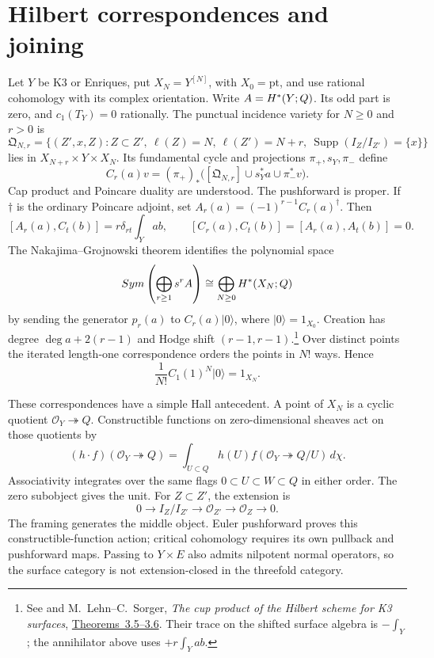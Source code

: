 \section{Hilbert correspondences and joining}
\label{sec:zbps-geometric-joining}

Let \(Y\) be K3 or Enriques, put \(X_N=Y^{[N]}\), with
\(X_0=\mathrm{pt}\), and use rational
cohomology with its complex orientation.  Write \(A=H^*(Y;Q)\).
Its odd part is zero, and \(c_1(T_Y)=0\) rationally.  The punctual
incidence variety for \(N\ge0\) and \(r>0\) is
\[
 \mathfrak Q_{N,r}=\{(Z',x,Z):Z\subset Z',\ \ell(Z)=N,
 \ \ell(Z')=N+r,\ \operatorname{Supp}(I_Z/I_{Z'})=\{x\}\}
\]
lies in \(X_{N+r}\times Y\times X_N\).  Its fundamental cycle
and projections \(\pi_+,s_Y,\pi_-\) define
\[
 C_r(a)v=(\pi_+)_*
       \bigl([\mathfrak Q_{N,r}]\cup s_Y^*a\cup\pi_-^*v\bigr).
\]
Cap product and Poincare duality are understood.  The pushforward
is proper.  If \(\dagger\) is the ordinary Poincare adjoint, set
\(A_r(a)=(-1)^{r-1}C_r(a)^\dagger\).  Then
\[
 [A_r(a),C_t(b)]=r\delta_{rt}\int_Yab,
 \qquad [C_r(a),C_t(b)]=[A_r(a),A_t(b)]=0.
\]
The Nakajima--Grojnowski theorem identifies the polynomial space
\[
 Sym\left(\bigoplus_{r\ge1}s^r A\right)
 \cong\bigoplus_{N\ge0}H^*(X_N;Q)
\]
by sending the generator \(p_r(a)\) to \(C_r(a)|0\rangle\),
where \(|0\rangle=1_{X_0}\).
Creation has degree \(\deg a+2(r-1)\) and Hodge shift
\((r-1,r-1)\).\footnote{See \cite{NakajimaHilbert1997} and
M.~Lehn--C.~Sorger, \emph{The cup product of the Hilbert scheme
for K3 surfaces}, \href{https://arxiv.org/abs/math/0012166}
{Theorems~3.5--3.6}.  Their trace on the shifted surface algebra
is \(-\int_Y\); the annihilator above uses \(+r\int_Yab\).}
Over distinct points the iterated length-one correspondence
orders the points in \(N!\) ways.  Hence
\[
 \frac1{N!}C_1(1)^N|0\rangle=1_{X_N}.
\]

These correspondences have a simple Hall antecedent.  A point of
\(X_N\) is a cyclic quotient \(\mathcal O_Y\twoheadrightarrow Q\).
Constructible functions on zero-dimensional sheaves act on those
quotients by
\[
 (h\cdot f)(\mathcal O_Y\twoheadrightarrow Q)
 =\int_{U\subset Q}h(U)
 f(\mathcal O_Y\twoheadrightarrow Q/U)\,d\chi.
\]
Associativity integrates over the same flags
\(0\subset U\subset W\subset Q\) in either order.  The zero
subobject gives the unit.  For \(Z\subset Z'\), the extension is
\[
 0\longrightarrow I_Z/I_{Z'}\longrightarrow\mathcal O_{Z'}
 \longrightarrow\mathcal O_Z\longrightarrow0.
\]
The framing generates the middle object.  Euler pushforward proves
this constructible-function action; critical cohomology requires
its own pullback and pushforward maps.  Passing to \(Y\times E\)
also admits nilpotent normal operators, so the surface category
is not extension-closed in the threefold category.

